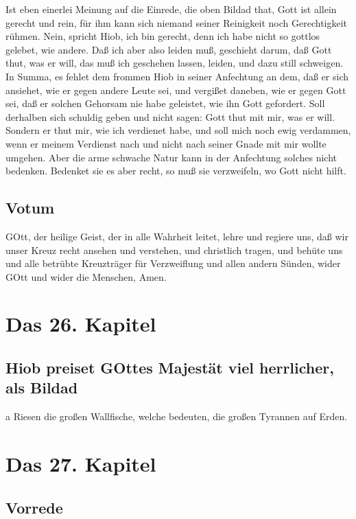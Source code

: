 Ist eben einerlei Meinung auf die Einrede, die oben Bildad that, Gott ist allein gerecht und rein, für ihm kann sich niemand seiner Reinigkeit noch Gerechtigkeit rühmen. Nein, spricht Hiob, ich bin gerecht, denn ich habe nicht so gottlos gelebet, wie andere. Daß ich aber also leiden muß, geschieht darum, daß Gott thut, was er will, das muß ich geschehen lassen, leiden, und dazu still schweigen. In Summa, es fehlet dem frommen Hiob in seiner Anfechtung an dem, daß er sich ansiehet, wie er gegen andere Leute sei, und vergißet daneben, wie er gegen Gott sei, daß er solchen Gehorsam nie habe geleistet, wie ihn Gott gefordert. Soll derhalben sich schuldig geben und nicht sagen: Gott thut mit mir, was er will. Sondern er thut mir, wie ich verdienet habe, und soll mich noch ewig verdammen, wenn er meinem Verdienst nach und nicht nach seiner Gnade mit mir wollte umgehen. Aber die arme schwache Natur kann in der Anfechtung solches nicht bedenken. Bedenket sie es aber recht, so muß sie verzweifeln, wo Gott nicht hilft.

\section{Votum}

GOtt, der heilige Geist, der in alle Wahrheit leitet, lehre und regiere uns, daß wir unser Kreuz recht ansehen und verstehen, und christlich tragen, und behüte uns und alle betrübte Kreuzträger für Verzweiflung und allen andern Sünden, wider GOtt und wider die Menschen, Amen.

\chapter{Das 26. Kapitel}

\section{Hiob preiset GOttes Majestät viel herrlicher, als Bildad}

a Riesen die großen Wallfische, welche bedeuten, die großen Tyrannen auf Erden.

\chapter{Das 27. Kapitel}

\section{Vorrede}

